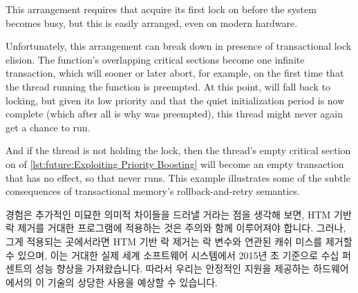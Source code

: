 \begin{fcvref}
This arrangement requires that  acquire its first
lock on  before the system becomes busy, but this is easily
arranged, even on modern hardware.

Unfortunately, this arrangement can break down in presence of transactional
lock elision.
The  function's overlapping critical sections become
one infinite transaction, which will sooner or later abort,
for example, on the first time that the thread running
the  function is preempted.
At this point,  will fall back to locking, but given
its low priority and that the quiet initialization period is now
complete (which after all is why  was preempted),
this thread might never again get a chance to run.

And if the  thread is not holding the lock, then
the  thread's empty critical section on  of
\cref{lst:future:Exploiting Priority Boosting}
will become an empty transaction that has no effect, so that
 never runs.
This example illustrates some of the subtle consequences of
transactional memory's rollback-and-retry semantics.
\end{fcvref}

\fi

경험은 추가적인 미묘한 의미적 차이들을 드러낼 거라는 점을 생각해 보면, HTM 기반
락 제거를 거대한 프로그램에 적용하는 것은 주의와 함께 이루어져야 합니다.
그러나, 그게 적용되는 곳에서라면 HTM 기반 락 제거는 락 변수와 연관된 캐쉬
미스를 제거할 수 있으며, 이는 거대한 실제 세계 소프트웨어 시스템에서 2015년 초
기준으로 수십 퍼센트의 성능 향상을 가져왔습니다.
따라서 우리는 안정적인 지원을 제공하는 하드웨어에서의 이 기술의 상당한 사용을
예상할 수 있습니다.

\iffalse

Given that experience will likely uncover additional subtle semantic
differences, application of HTM-based lock elision to large programs
should be undertaken with caution.
That said, where it does apply, HTM-based lock elision can eliminate
the cache misses associated with the lock variable, which has resulted
in tens of percent performance increases in large real-world software
systems as of early 2015.
We can therefore expect to see substantial use of this technique on
hardware providing reliable support for it.

\fi

